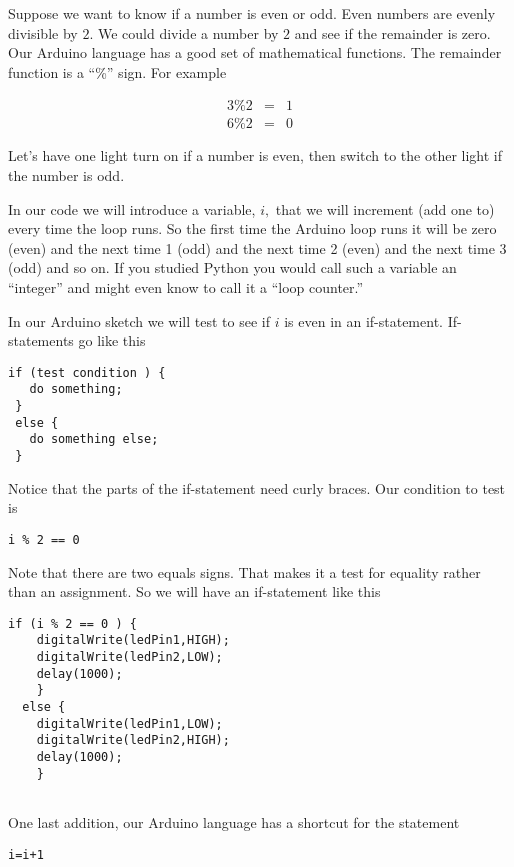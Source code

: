 Suppose we want to know if a number is even or odd. Even numbers are evenly divisible by $2.$ We could divide a number by $2$ and see if the remainder is zero. Our Arduino language has a good set of mathematical functions. The remainder function is a ``\%'' sign. For example 

\begin{eqnarray*}
	3\%2 &=&1 \\
	6\%2 &=&0
\end{eqnarray*}

Let's have one light turn on if a number is even, then switch to the other light if the number is odd.

In our code we will introduce a variable, $i,$ that we will increment (add one to) every time the loop runs. So the first time the Arduino loop runs it will be zero (even) and the next time 1 (odd) and the next time 2 (even) and the next time 3 (odd) and so on. If you studied Python you would call such a variable an ``integer'' and might even know to call it a ``loop counter.'' 

In our Arduino sketch we will test to see if $i$ is even in an if-statement. If-statements go like this 

\begin{lstlisting}[language=Arduino]
 if (test condition ) {
   do something;
 }
 else {
   do something else;
 }
\end{lstlisting}

Notice that the parts of the if-statement need curly braces. Our condition to test is

\begin{lstlisting}[language=Arduino]
  i % 2 == 0
\end{lstlisting}

Note that there are two equals signs. That makes it a test for equality rather than an assignment. So we will have an if-statement like this

 \begin{lstlisting}[language=Arduino]
  if (i % 2 == 0 ) {
    digitalWrite(ledPin1,HIGH);
    digitalWrite(ledPin2,LOW);
    delay(1000);
    }
  else {
    digitalWrite(ledPin1,LOW);
    digitalWrite(ledPin2,HIGH);
    delay(1000);
    }
 
 \end{lstlisting}

One last addition, our Arduino language has a shortcut for the statement

\begin{lstlisting}[language=Arduino]
  i=i+1
\end{lstlisting}

